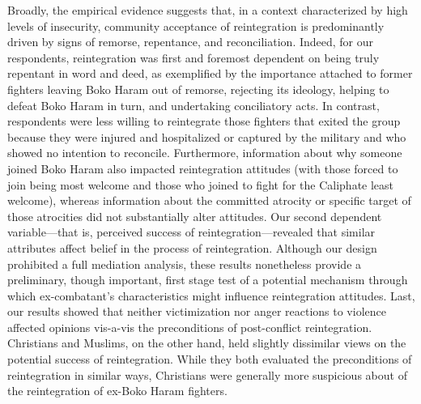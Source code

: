 Broadly, the empirical evidence suggests that, in a context characterized by high levels of insecurity, community acceptance of reintegration is predominantly driven by signs of remorse, repentance, and reconciliation. Indeed, for our respondents, reintegration was first and foremost dependent on being truly repentant in word and deed, as exemplified by the importance attached to former fighters leaving Boko Haram out of remorse, rejecting its ideology, helping to defeat Boko Haram in turn, and undertaking conciliatory acts. In contrast, respondents were less willing to reintegrate those fighters that exited the group because they were injured and hospitalized or captured by the military and who showed no intention to reconcile. Furthermore, information about why someone joined Boko Haram also impacted reintegration attitudes (with those forced to join being most welcome and those who joined to fight for the Caliphate least welcome), whereas information about the committed atrocity or specific target of those atrocities did not substantially alter attitudes. Our second dependent variable---that is, perceived success of reintegration---revealed that similar attributes affect belief in the process of reintegration. Although our design prohibited a full mediation analysis, these results nonetheless provide a preliminary, though important, first stage test of a potential mechanism through which ex-combatant's characteristics might influence reintegration attitudes. Last, our results showed that neither victimization nor anger reactions to violence affected opinions vis-a-vis the preconditions of post-conflict reintegration. Christians and Muslims, on the other hand, held slightly dissimilar views on the potential success of reintegration. While they both evaluated the preconditions of reintegration in similar ways, Christians were generally more suspicious about of the reintegration of ex-Boko Haram fighters. 


